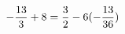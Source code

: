 \documentclass[preview]{standalone}
\begin{document}
\begin{align*}
\special{dvisvgm:raw <g id='unique000'>}- \frac{13}{3} + 8 = \frac{3}{2} - 6(- \frac{13}{36})\special{dvisvgm:raw </g>}
\end{align*}
\end{document}
